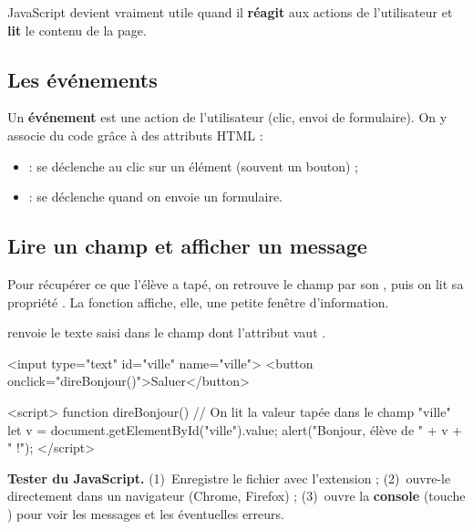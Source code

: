 JavaScript devient vraiment utile quand il \textbf{réagit} aux actions de
l'utilisateur et \textbf{lit} le contenu de la page.

\subsection{Les événements}

Un \textbf{événement} est une action de l'utilisateur (clic, envoi de formulaire).
On y associe du code grâce à des attributs HTML :

\begin{itemize}
  \item {} : se déclenche au clic sur un élément (souvent un bouton) ;
  \item {} : se déclenche quand on envoie un formulaire.
\end{itemize}

\subsection{Lire un champ et afficher un message}

Pour récupérer ce que l'élève a tapé, on retrouve le champ par son , puis
on lit sa propriété . La fonction  affiche, elle,
une petite fenêtre d'information.

\begin{syntaxe}
 renvoie le texte saisi dans le champ
dont l'attribut  vaut .
\end{syntaxe}

\begin{codehtml}
<input type="text" id="ville" name="ville">
<button onclick="direBonjour()">Saluer</button>

<script>
  function direBonjour() {
    // On lit la valeur tapée dans le champ "ville"
    let v = document.getElementById("ville").value;
    alert("Bonjour, élève de " + v + " !");
  }
</script>
\end{codehtml}


\begin{methode}
\textbf{Tester du JavaScript.} (1)~Enregistre le fichier avec l'extension
 ; (2)~ouvre-le directement dans un navigateur (Chrome, Firefox) ;
(3)~ouvre la \textbf{console} (touche ) pour voir les messages
 et les éventuelles erreurs.
\end{methode}

